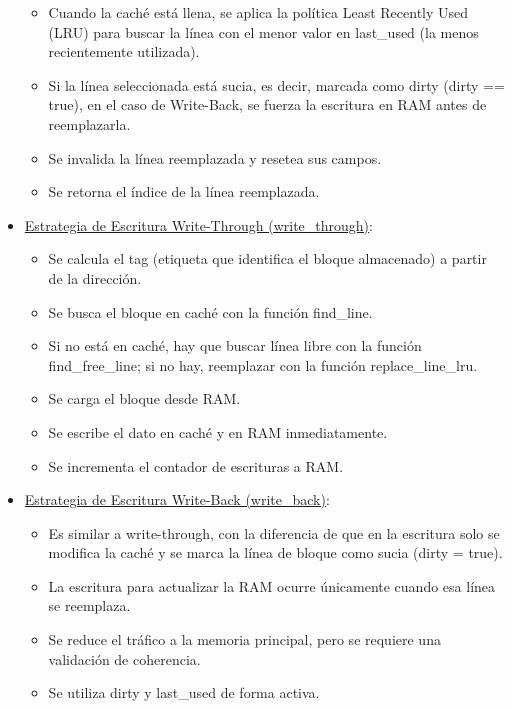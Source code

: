 \documentclass{article}
\begin{document}
\begin{itemize}
        \begin{itemize}
            \item Cuando la caché está llena, se aplica la política Least Recently Used (LRU) para buscar la línea con el menor valor en last\_used (la menos recientemente utilizada).
            \item Si la línea seleccionada está sucia, es decir, marcada como dirty (dirty == true), en el caso de Write-Back, se fuerza la escritura en RAM antes de reemplazarla.
            \item Se invalida la línea reemplazada y resetea sus campos.
            \item Se retorna el índice de la línea reemplazada.
        \end{itemize}

    \quad


    \item {\underline{Estrategia de Escritura Write-Through (write\_through)}:}

        \begin{itemize}
            \item Se calcula el tag (etiqueta que identifica el bloque almacenado) a partir de la dirección.
            \item Se busca el bloque en caché con la función find\_line.
            \item Si no está en caché, hay que buscar línea libre con la función find\_free\_line; si no hay, reemplazar con la función replace\_line\_lru.
            \item Se carga el bloque desde RAM.
            \item Se escribe el dato en caché y en RAM inmediatamente.
            \item Se incrementa el contador de escrituras a RAM.
        \end{itemize}

    \quad


     \item {\underline{Estrategia de Escritura Write-Back (write\_back)}:}

        \begin{itemize}
            \item Es similar a write-through, con la diferencia de que en la escritura solo se modifica la caché y se marca la línea de bloque como sucia (dirty = true).
            \item La escritura para actualizar la RAM ocurre únicamente cuando esa línea se reemplaza.
            \item Se reduce el tráfico a la memoria principal, pero se requiere una validación de coherencia.
            \item Se utiliza dirty y last\_used de forma activa.
        \end{itemize}


\end{itemize}
\end{document}
